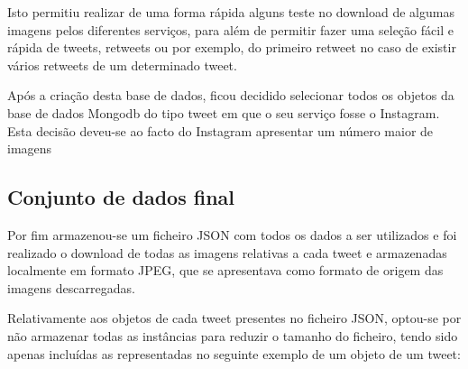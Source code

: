 Isto permitiu realizar de uma forma rápida alguns teste no download de algumas imagens pelos diferentes serviços, para além de permitir fazer uma seleção fácil e rápida de tweets, retweets ou por exemplo, do primeiro retweet no caso de existir vários retweets de um determinado tweet. 

Após a criação desta base de dados, ficou decidido selecionar todos os objetos da base de dados Mongodb do tipo tweet em que o seu serviço fosse o Instagram. Esta decisão deveu-se ao facto do Instagram apresentar um número maior de imagens 

\subsection{Conjunto de dados final}

Por fim armazenou-se um ficheiro JSON com todos os dados a ser utilizados e foi realizado o download de todas as imagens relativas a cada tweet e armazenadas localmente em formato JPEG, que se apresentava como formato de origem das imagens descarregadas. 

Relativamente aos objetos de cada tweet presentes no ficheiro JSON, optou-se por não armazenar todas as instâncias para reduzir o tamanho do ficheiro, tendo sido apenas incluídas as representadas no seguinte exemplo de um objeto de um tweet:





%
%
